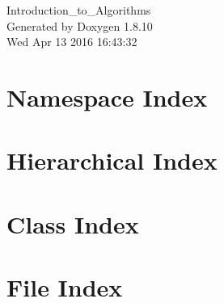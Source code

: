 \documentclass[twoside]{book}
\newcommand{\+}{\discretionary{\mbox{\scriptsize$\hookleftarrow$}}{}{}}
\newcommand{\clearemptydoublepage}{%
  \newpage{\pagestyle{empty}\cleardoublepage}%
}
\begin{document}
\hypersetup{pageanchor=false,
             bookmarks=true,
             bookmarksnumbered=true,
             pdfencoding=unicode
            }
\begin{titlepage}
\vspace*{7cm}
\begin{center}%
{\Large Introduction\+\_\+to\+\_\+\+Algorithms }\\
\vspace*{1cm}
{\large Generated by Doxygen 1.8.10}\\
\vspace*{0.5cm}
{\small Wed Apr 13 2016 16:43:32}\\
\end{center}
\end{titlepage}
\clearemptydoublepage
\tableofcontents
\clearemptydoublepage
{}
\hypersetup{pageanchor=true}

\chapter{Namespace Index}

\chapter{Hierarchical Index}

\chapter{Class Index}

\chapter{File Index}

\end{document}
